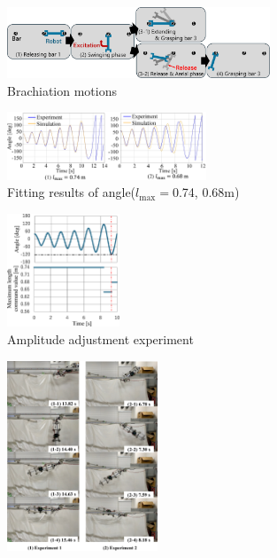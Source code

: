 \begin{small}
\begin{figure}[t]
  \centering
  \includegraphics[width=0.7\textwidth]{fig/brachiationFig-4.eps} %
  \vspace{-5mm}
  \caption{Brachiation motions}
\end{figure}
\begin{figure}[t]
  \centering
  \includegraphics[width=0.53\textwidth]{fig/FittingAngle3.eps} %
  \vspace{-10mm}
  \caption{Fitting results of angle($l_{\mathrm{max}}=$0.74, 0.68m)}
\end{figure}
\begin{figure}[h]
  \centering
  \includegraphics[width=0.3\textwidth]{fig/AdjustForMaezuri.eps} %
  \vspace{-7mm}
  \caption{Amplitude adjustment experiment}
\end{figure}
\begin{figure}[t]
  \centering
  \includegraphics[width=0.4\textwidth]{fig/NoAerialForMaezuri.eps} %

\end{figure}
\end{small}
